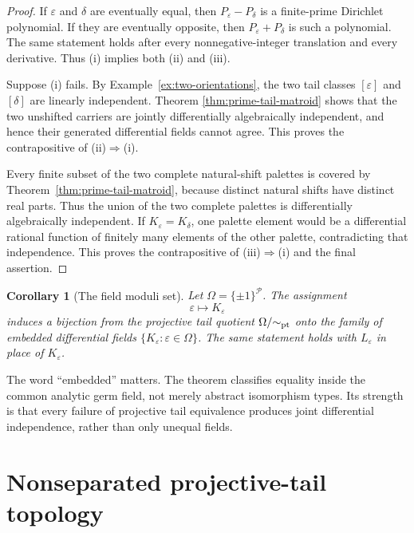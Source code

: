 \documentclass[11pt]{article}
\newtheorem{corollary}[theorem]{Corollary}
\theoremstyle{definition}
\theoremstyle{remark}
\newcommand{\cP}{\mathcal P}
\begin{document}
\begin{proof}
If \(\varepsilon\) and \(\delta\) are eventually equal, then
\(P_\varepsilon-P_\delta\) is a finite-prime Dirichlet polynomial.  If they are eventually
opposite, then \(P_\varepsilon+P_\delta\) is such a polynomial.  The same statement holds after
every nonnegative-integer translation and every derivative.  Thus (i) implies both (ii) and (iii).

Suppose (i) fails.  By Example~\ref{ex:two-orientations}, the two tail classes
\([\varepsilon]\) and \([\delta]\) are linearly independent.  Theorem
\ref{thm:prime-tail-matroid} shows that the two unshifted carriers are jointly differentially
algebraically independent, and hence their generated differential fields cannot agree.  This
proves the contrapositive of (ii)\(\Rightarrow\)(i).

Every finite subset of the two complete natural-shift palettes is covered by
Theorem~\ref{thm:prime-tail-matroid}, because distinct natural shifts have distinct real parts.
Thus the union of the two complete palettes is differentially algebraically independent.  If
\(K_\varepsilon=K_\delta\), one palette element would be a differential rational function of
finitely many elements of the other palette, contradicting that independence.  This proves the
contrapositive of (iii)\(\Rightarrow\)(i) and the final assertion.
\end{proof}

\begin{corollary}[The field moduli set]\label{cor:field-moduli}
Let \(\Omega=\{\pm1\}^{\cP}\).  The assignment
\[
  \varepsilon\longmapsto K_\varepsilon
\]
induces a bijection from the projective tail quotient \(\Omega/{\sim_{\rm pt}}\) onto the
family of embedded differential fields \(\{K_\varepsilon:\varepsilon\in\Omega\}\).
The same statement holds with \(L_\varepsilon\) in place of \(K_\varepsilon\).
\end{corollary}

The word ``embedded'' matters.  The theorem classifies equality inside the common analytic germ
field, not merely abstract isomorphism types.  Its strength is that every failure of projective
tail equivalence produces joint differential independence, rather than only unequal fields.

\section{Nonseparated projective-tail topology}\label{sec:topology}
\end{document}
